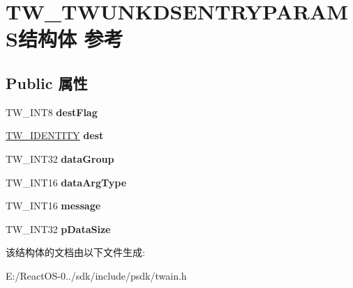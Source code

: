 \hypertarget{struct_t_w___t_w_u_n_k_d_s_e_n_t_r_y_p_a_r_a_m_s}{}\section{T\+W\+\_\+\+T\+W\+U\+N\+K\+D\+S\+E\+N\+T\+R\+Y\+P\+A\+R\+A\+M\+S结构体 参考}
\label{struct_t_w___t_w_u_n_k_d_s_e_n_t_r_y_p_a_r_a_m_s}
\subsection*{Public 属性}
\begin{DoxyCompactItemize}
\item 
\mbox{\label{struct_t_w___t_w_u_n_k_d_s_e_n_t_r_y_p_a_r_a_m_s_ac52cd2341fe473377c4396be5d250d89}} 
T\+W\+\_\+\+I\+N\+T8 {\bfseries dest\+Flag}
\item 
\mbox{\label{struct_t_w___t_w_u_n_k_d_s_e_n_t_r_y_p_a_r_a_m_s_a0db983e18a9e99ea00835bd5e4326b3e}} 
\hyperlink{struct_t_w___i_d_e_n_t_i_t_y}{T\+W\+\_\+\+I\+D\+E\+N\+T\+I\+TY} {\bfseries dest}
\item 
\mbox{\label{struct_t_w___t_w_u_n_k_d_s_e_n_t_r_y_p_a_r_a_m_s_aa2eb987514ffce8cf9bae10f8926f4b9}} 
T\+W\+\_\+\+I\+N\+T32 {\bfseries data\+Group}
\item 
\mbox{\label{struct_t_w___t_w_u_n_k_d_s_e_n_t_r_y_p_a_r_a_m_s_a29a764f5db635d2fc7694291f2f92bc8}} 
T\+W\+\_\+\+I\+N\+T16 {\bfseries data\+Arg\+Type}
\item 
\mbox{\label{struct_t_w___t_w_u_n_k_d_s_e_n_t_r_y_p_a_r_a_m_s_aa6834e59f78af444a9667eb4b824a244}} 
T\+W\+\_\+\+I\+N\+T16 {\bfseries message}
\item 
\mbox{\label{struct_t_w___t_w_u_n_k_d_s_e_n_t_r_y_p_a_r_a_m_s_a2bf5d4b2260b8df9ccbfd1121f75b8a0}} 
T\+W\+\_\+\+I\+N\+T32 {\bfseries p\+Data\+Size}
\end{DoxyCompactItemize}


该结构体的文档由以下文件生成\+:\begin{DoxyCompactItemize}
\item 
E\+:/\+React\+O\+S-\/0../sdk/include/psdk/twain.\+h\end{DoxyCompactItemize}
